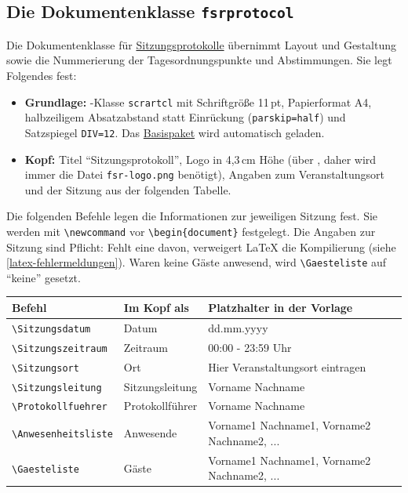 \subsection{Die Dokumentenklasse \texttt{fsrprotocol}}
\label{latex-fsrprotocol}
Die Dokumentenklasse für \hyperref[protokoll]{Sitzungsprotokolle} übernimmt Layout und Gestaltung sowie die Nummerierung der Tagesordnungspunkte und Abstimmungen. Sie legt Folgendes fest:
\begin{itemize}
	\item \textbf{Grundlage:} \KOMAScript{}-Klasse \texttt{scrartcl} mit Schriftgröße 11\,pt, Papierformat A4, halbzeiligem Absatzabstand statt Einrückung (\texttt{parskip=half}) und Satzspiegel \texttt{DIV=12}. Das \hyperref[latex-fsrbase]{Basispaket} wird automatisch geladen.
	\item \textbf{Kopf:} Titel \enquote{Sitzungsprotokoll}, Logo in 4,3\,cm Höhe (über \texttt{\fsrlogo}, daher wird immer die Datei \texttt{fsr-logo.png} benötigt), Angaben zum Veranstaltungsort und der Sitzung aus der folgenden Tabelle.
\end{itemize}

Die folgenden Befehle legen die Informationen zur jeweiligen Sitzung fest. Sie werden mit \texttt{\textbackslash newcommand} vor \texttt{\textbackslash begin\{document\}} festgelegt. Die Angaben zur Sitzung sind Pflicht: Fehlt eine davon, verweigert \LaTeX{} die Kompilierung (siehe \autoref{latex-fehlermeldungen}). Waren keine Gäste anwesend, wird \texttt{\textbackslash Gaesteliste} auf \enquote{keine} gesetzt.

\begin{center}
	\begin{tabularx}{\linewidth}{llX}
		\toprule
		\textbf{Befehl}                           & \textbf{Im Kopf als} & \textbf{Platzhalter in der Vorlage}         \\
		\midrule
		\texttt{\textbackslash Sitzungsdatum}     & Datum                & dd.mm.yyyy                                  \\
		\texttt{\textbackslash Sitzungszeitraum}  & Zeitraum             & 00:00 - 23:59 Uhr                           \\
		\texttt{\textbackslash Sitzungsort}       & Ort                  & Hier Veranstaltungsort eintragen            \\
		\texttt{\textbackslash Sitzungsleitung}   & Sitzungsleitung      & Vorname Nachname                            \\
		\texttt{\textbackslash Protokollfuehrer}  & Protokollführer      & Vorname Nachname                            \\
		\texttt{\textbackslash Anwesenheitsliste} & Anwesende            & Vorname1 Nachname1, Vorname2 Nachname2, ... \\
		\texttt{\textbackslash Gaesteliste}       & Gäste                & Vorname1 Nachname1, Vorname2 Nachname2, ... \\
		\bottomrule
	\end{tabularx}
\end{center}

